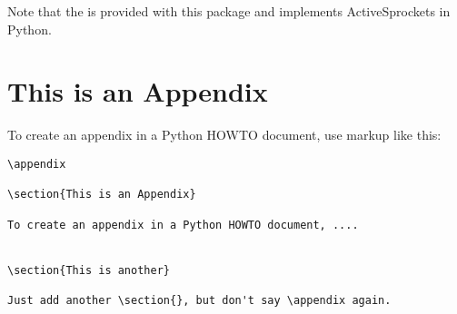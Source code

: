 \documentclass{howto}
\begin{document}
Note that the  is provided with this package and
implements ActiveSprockets in Python.






\appendix

\section{This is an Appendix}

To create an appendix in a Python HOWTO document, use markup like
this:

\begin{verbatim}
\appendix

\section{This is an Appendix}

To create an appendix in a Python HOWTO document, ....


\section{This is another}

Just add another \section{}, but don't say \appendix again.
\end{verbatim}
\end{document}
